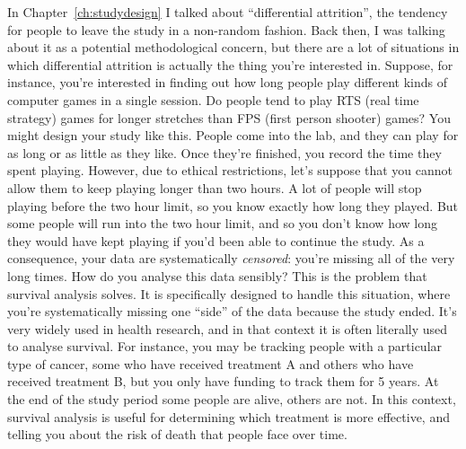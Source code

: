 \begin{itemize}
 In Chapter~\ref{ch:studydesign} I talked about ``differential attrition'', the tendency for people to leave the study in a non-random fashion. Back then, I was talking about it as a potential methodological concern, but there are a lot of situations in which differential attrition is actually the thing you're interested in. Suppose, for instance, you're interested in finding out how long people play different kinds of computer games in a single session. Do people tend to play RTS (real time strategy) games for longer stretches than FPS (first person shooter) games? You might design your study like this. People come into the lab, and they can play for as long or as little as they like. Once they're finished, you record the time they spent playing. However, due to ethical restrictions, let's suppose that you cannot allow them to keep playing longer than two hours. A lot of people will stop playing before the two hour limit, so you know exactly how long they played. But some people will run into the two hour limit, and so you don't know how long they would have kept playing if you'd been able to continue the study. As a consequence, your data are systematically {\it censored}: you're missing all of the very long times. How do you analyse this data sensibly? This is the problem that survival analysis solves. It is specifically designed to handle this situation, where you're systematically missing one ``side'' of the data because the study ended. It's very widely used in health research, and in that context it is often literally used to analyse survival. For instance, you may be tracking people with a particular type of cancer, some who have received treatment A and others who have received treatment B, but you only have funding to track them for 5 years. At the end of the study period some people are alive, others are not. In this context, survival analysis is useful for determining which treatment is more effective, and telling you about the risk of death that people face over time. 


\end{itemize}
